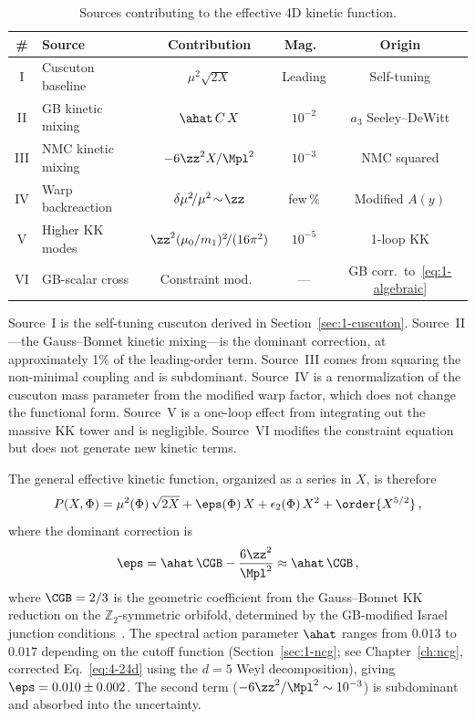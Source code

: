 \begin{table}[h]
\centering
\caption{Sources contributing to the effective 4D kinetic function.}
\label{tab:1-kk-sources}
\small
\begin{tabular}{@{}clccc@{}}
\toprule
\# & Source & Contribution & Mag.\ & Origin \\
\midrule
I & Cuscuton baseline & $\mu^2\!\sqrt{2X}$ & Leading & Self-tuning \\
II & GB kinetic mixing & $\ahat\, C\, X$ & $10^{-2}$ & $a_3$ Seeley--DeWitt \\
III & NMC kinetic mixing & $-6\zz^2 X/\Mpl^2$ & $10^{-3}$ & NMC squared \\
IV & Warp backreaction & $\delta\mu^2\!/\mu^2\!\sim\!\zz$ & few\,\% & Modified $A(y)$ \\
V & Higher KK modes & $\zz^2(\mu_0/m_1)^2\!/(16\pi^2)$ & $10^{-5}$ & 1-loop KK \\
VI & GB-scalar cross & Constraint mod.\ & --- & GB corr.\ to~\eqref{eq:1-algebraic} \\
\bottomrule
\end{tabular}
\end{table}

Source~I is the self-tuning cuscuton derived in Section~\ref{sec:1-cuscuton}. Source~II---the Gauss--Bonnet kinetic mixing---is the dominant correction, at approximately 1\% of the leading-order term. Source~III comes from squaring the non-minimal coupling and is subdominant. Source~IV is a renormalization of the cuscuton mass parameter from the modified warp factor, which does not change the functional form. Source~V is a one-loop effect from integrating out the massive KK tower and is negligible. Source~VI modifies the constraint equation but does not generate new kinetic terms.

The general effective kinetic function, organized as a series in $X$, is therefore
\begin{equation}
\label{eq:1-corrected-P}
P(X, \Phi) = \mu^2(\Phi)\,\sqrt{2X} + \eps(\Phi)\, X + \epsilon_2(\Phi)\, X^2 + \order{X^{5/2}}\,,
\end{equation}
where the dominant correction is
\begin{equation}
\label{eq:1-eps1}
\eps = \ahat\, \CGB - \frac{6\zz^2}{\Mpl^2} \approx \ahat\, \CGB\,,
\end{equation}
where $\CGB = 2/3$ is the geometric coefficient from the Gauss--Bonnet KK reduction on the $\mathbb{Z}_2$-symmetric orbifold, determined by the GB-modified Israel junction conditions~\cite{ch1:davis03}. The spectral action parameter $\ahat$ ranges from $0.013$ to $0.017$ depending on the cutoff function (Section~\ref{sec:1-ncg}; see Chapter~\ref{ch:ncg}, corrected Eq.~\eqref{eq:4-24d} using the $d = 5$ Weyl decomposition), giving $\eps = 0.010 \pm 0.002$. The second term ($-6\zz^2/\Mpl^2 \sim 10^{-3}$) is subdominant and absorbed into the uncertainty.


